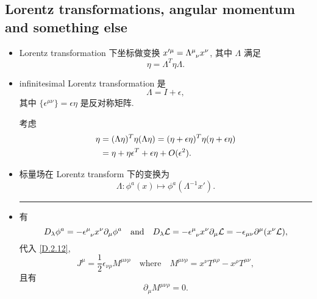 \subsection{Lorentz transformations, angular momentum and something else}
\begin{itemize}
	\item Lorentz transformation 下坐标做变换 $x'^\mu = \tensor{\Lambda}{^\mu_\nu} x^\nu$, 其中 $\Lambda$ 满足
	\begin{equation}
		\eta = \Lambda^T \eta \Lambda.
	\end{equation}
	
	\item infinitesimal Lorentz transformation 是
	\begin{equation}
		\Lambda = I + \epsilon,
	\end{equation}
	其中 $\{\epsilon^{\mu \nu}\} = \epsilon \eta$ 是反对称矩阵.
	
	\begin{tcolorbox}[title=proof:]
		考虑
		\begin{align}
			\eta &= (\Lambda \eta)^T \eta (\Lambda \eta) = (\eta + \epsilon \eta)^T \eta (\eta + \epsilon \eta) \notag \\
			&= \eta + \eta \epsilon^T + \epsilon \eta + O(\epsilon^2).
		\end{align}
	\end{tcolorbox}
	
	\noindent\hdashrule[0.5ex]{\linewidth}{0.5pt}{1mm} %
	
	\item 标量场在 Lorentz transform 下的变换为
	\begin{equation}
		\Lambda : \phi^a(x) \mapsto \phi^a(\Lambda^{- 1} x').
	\end{equation}
	
	\noindent\rule[0.5ex]{\linewidth}{0.5pt} %
	
	\item 有
	\begin{equation}
		D_\lambda \phi^a = - \tensor{\epsilon}{^\mu_\nu} x^\nu \partial_\mu \phi^a \quad \text{and} \quad D_\lambda \mathcal{L} = - \tensor{\epsilon}{^\mu_\nu} x^\nu \partial_\mu \mathcal{L} = - \epsilon_{\mu \nu} \partial^\mu(x^\nu \mathcal{L}),
	\end{equation}
	代入 \eqref{D.2.12},
	\begin{equation}
		J^\mu = \frac{1}{2} \epsilon_{\nu \rho} M^{\mu \nu \rho} \quad \text{where} \quad M^{\mu \nu \rho} = x^\nu T^{\mu \rho} - x^\rho T^{\mu \nu},
	\end{equation}
	且有
	\begin{equation}
		\partial_\mu M^{\mu \nu \rho} = 0.
	\end{equation}
	

\end{itemize}
